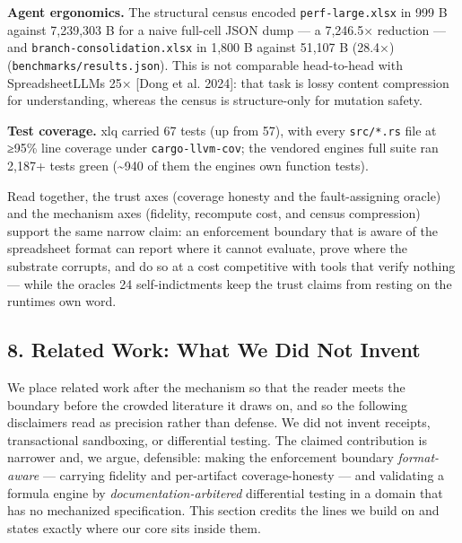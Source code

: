 \documentclass[
]{article}
\begin{document}
\textbf{Agent ergonomics.} The structural census encoded
\texttt{perf-large.xlsx} in 999 B against 7,239,303 B for a naive
full-cell JSON dump --- a 7,246.5× reduction --- and
\texttt{branch-consolidation.xlsx} in 1,800 B against 51,107 B (28.4×)
(\texttt{benchmarks/results.json}). This is not comparable head-to-head
with SpreadsheetLLM\textquotesingle s 25× {[}Dong et al. 2024{]}: that
task is lossy content compression for understanding, whereas the census
is structure-only for mutation safety.

\textbf{Test coverage.} xlq carried 67 tests (up from 57), with every
\texttt{src/*.rs} file at ≥95\% line coverage under
\texttt{cargo-llvm-cov}; the vendored engine\textquotesingle s full
suite ran 2,187+ tests green (\textasciitilde940 of them the
engine\textquotesingle s own function tests).

Read together, the trust axes (coverage honesty and the fault-assigning
oracle) and the mechanism axes (fidelity, recompute cost, and census
compression) support the same narrow claim: an enforcement boundary that
is aware of the spreadsheet format can report where it cannot evaluate,
prove where the substrate corrupts, and do so at a cost competitive with
tools that verify nothing --- while the oracle\textquotesingle s 24
self-indictments keep the trust claims from resting on the
runtime\textquotesingle s own word.

\subsection{8. Related Work: What We Did Not
Invent}\label{8-related-work-what-we-did-not-invent}

We place related work after the mechanism so that the reader meets the
boundary before the crowded literature it draws on, and so the following
disclaimers read as precision rather than defense. We did not invent
receipts, transactional sandboxing, or differential testing. The claimed
contribution is narrower and, we argue, defensible: making the
enforcement boundary \emph{format-aware} --- carrying fidelity and
per-artifact coverage-honesty --- and validating a formula engine by
\emph{documentation-arbitered} differential testing in a domain that has
no mechanized specification. This section credits the lines we build on
and states exactly where our core sits inside them.
\end{document}
